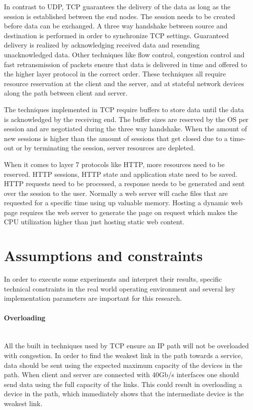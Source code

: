 In contrast to UDP, TCP guarantees the delivery of the data as long as the session is established between the end nodes.
The session needs to be created before data can be exchanged. 
A three way handshake between source and destination is performed in order to synchronize TCP settings. 
Guaranteed delivery is realized by acknowledging received data and resending unacknowledged data. 
Other techniques like flow control, congestion control and fast retransmission of packets ensure that data is delivered in time and offered to the higher layer protocol in the correct order. 
These techniques all require resource reservation at the client and the server, and at stateful network devices along the path between client and server. 

The techniques implemented in TCP require buffers to store data until the data is acknowledged by the receiving end.
The buffer sizes are reserved by the OS per session and are negotiated during the three way handshake.  
When the amount of new sessions is higher than the amount of sessions that get closed due to a time-out or by terminating the session, server resources are depleted.

When it comes to layer 7 protocols like HTTP, more resources need to be reserved. HTTP sessions, HTTP state and application state need to be saved. 
HTTP requests need to be processed, a response needs to be generated and sent over the session to the user. Normally a web server will cache files that are requested for a specific time using up valuable memory. Hosting a dynamic web page requires the web server to generate the page on request which makes the CPU utilization higher than just hosting static web content. 

\section{Assumptions and constraints}\label{sec:specifications}
In order to execute some experiments and interpret their results, specific technical constraints in the real world operating environment and several key implementation parameters are important for this research.

\paragraph{Overloading}\label{par:overload}\mbox{}\\
All the built in techniques used by TCP ensure an IP path will not be overloaded with congestion. 
In order to find the weakest link in the path towards a service, data should be sent using the expected maximum capacity of the devices in the path.
When client and server are connected with 40Gb/s interfaces one should send data using the full capacity of the links.
This could result in overloading a device in the path, which immediately shows that the intermediate device is the weakest link.

